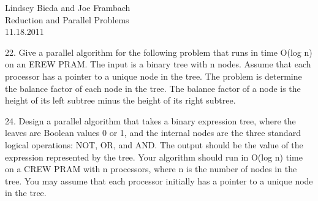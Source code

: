 \documentclass[10pt]{article}
\begin{document}
	\begin{flushright}
	Lindsey Bieda and Joe Frambach\\
	Reduction and Parallel Problems\\
	11.18.2011
	\end{flushright}


22. Give a parallel algorithm for the following problem that runs in time O(log n) on an EREW PRAM.
The input is a binary tree with n nodes. Assume that each processor has a pointer to a unique node
in the tree. The problem is determine the balance factor of each node in the tree. The balance factor
of a node is the height of its left subtree minus the height of its right subtree.

24. Design a parallel algorithm that takes a binary expression tree, where the leaves are Boolean values
0 or 1, and the internal nodes are the three standard logical operations: NOT, OR, and AND. The
output should be the value of the expression represented by the tree. Your algorithm should run in
O(log n) time on a CREW PRAM with n processors, where n is the number of nodes in the tree. You
may assume that each processor initially has a pointer to a unique node in the tree.
\end{document}
